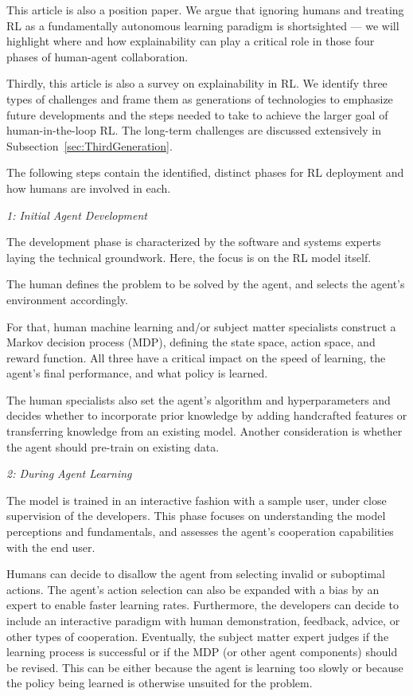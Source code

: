 \documentclass[twoside,11pt]{article}
\begin{document}
This article is also a position paper. We argue that ignoring humans and treating RL as a fundamentally autonomous learning paradigm is shortsighted --- we will highlight where and how explainability can play a critical role in those four phases of human-agent collaboration. 

Thirdly, this article is also a survey on explainability in RL. We identify three types of challenges and frame them as generations of technologies to emphasize future developments and the steps needed to take to achieve the larger goal of human-in-the-loop RL. The long-term challenges are discussed extensively in Subsection~\ref{sec:ThirdGeneration}.

The following steps contain the identified, distinct phases for RL deployment and how humans are involved in each.

\vspace{2mm}
\emph{1: Initial Agent Development}

The development phase is characterized by the software and systems experts laying the technical groundwork. Here, the focus is on the RL model itself.

The human defines the problem to be solved by the agent, and selects the agent’s environment accordingly.

For that, human machine learning and/or subject matter specialists construct a Markov decision process (MDP), defining the state space, action space, and reward function. All three have a critical impact on the speed of learning, the agent's final performance, and what policy is learned. 

The human specialists also set the agent's algorithm and hyperparameters and decides whether to incorporate prior knowledge by adding handcrafted features or transferring knowledge from an existing model. Another consideration is whether the agent should pre-train on existing data.
\vspace{2mm}

\emph{2: During Agent Learning}

The model is trained in an interactive fashion with a sample user, under close supervision of the developers. This phase focuses on understanding the model perceptions and fundamentals, and assesses the agent’s cooperation capabilities with the end user. 

Humans can decide to disallow the agent from selecting invalid or suboptimal actions. The agent's action selection can also be expanded with a bias by an expert to  enable faster learning rates. Furthermore, the developers can decide to include an interactive paradigm with human demonstration, feedback, advice, or other types of cooperation.
Eventually, the subject matter expert judges if the learning process is successful or if the MDP (or other agent components) should be revised. This can be either because the agent is learning too slowly or because the policy being learned is otherwise unsuited for the problem.
\vspace{2mm}
\end{document}
